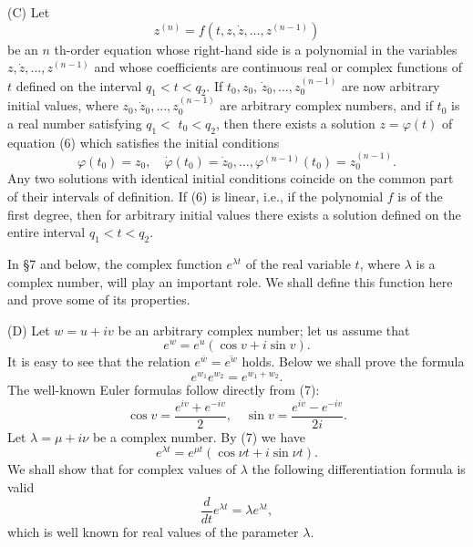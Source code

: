 \documentclass[10pt,a5paper]{book}
\theoremstyle{plain}
\theoremstyle{definition}
\theoremstyle{remark}
\begin{document}
(C) Let
\begin{equation*}
z^{(n)}=f\left(t, z, \dot{z}, \ldots, z^{(n-1)}\right) \tag{6}
\end{equation*}
be an $n$ th-order equation whose right-hand side is a polynomial in the variables $z, \dot{z}, \ldots, z^{(n-1)}$ and whose coefficients are continuous real or complex functions of $t$ defined on the interval $q_{1}<t<q_{2}$. If $t_{0}, z_{0}$, $\dot{z}_{0}, \ldots, z_{0}^{(n-1)}$ are now arbitrary initial values, where $z_{0}, \dot{z}_{0}, \ldots, z_{0}^{(n-1)}$ are arbitrary complex numbers, and if $t_{0}$ is a real number satisfying $q_{1}<$ $t_{0}<q_{2}$, then there exists a solution $z=\varphi(t)$ of equation (6) which satisfies the initial conditions
\[
\varphi\left(t_{0}\right)=z_{0}, \quad \dot{\varphi}\left(t_{0}\right)=\dot{z}_{0}, \ldots, \varphi^{(n-1)}\left(t_{0}\right)=z_{0}^{(n-1)} .
\]
Any two solutions with identical initial conditions coincide on the common part of their intervals of definition. If (6) is linear, i.e., if the polynomial $f$ is of the first degree, then for arbitrary initial values there exists a solution defined on the entire interval $q_{1}<t<q_{2}$.

In §7 and below, the complex function $e^{\lambda t}$ of the real variable $t$, where $\lambda$ is a complex number, will play an important role. We shall define this function here and prove some of its properties.

(D) Let $w=u+i v$ be an arbitrary complex number; let us assume that
\begin{equation*}
e^{w}=e^{u}(\cos v+i \sin v) . \tag{7}
\end{equation*}
It is easy to see that the relation $e^{\bar{w}}=\overline{e^{w}}$ holds. Below we shall prove the formula
\begin{equation*}
e^{w_{1}} e^{w_{2}}=e^{w_{1}+w_{2}} . \tag{8}
\end{equation*}
The well-known Euler formulas follow directly from (7):
\[
\cos v=\frac{e^{i v}+e^{-i v}}{2}, \quad \sin v=\frac{e^{i v}-e^{-i v}}{2 i} .
\]
Let $\lambda=\mu+i \nu$ be a complex number. By (7) we have
\[
e^{\lambda t}=e^{\mu t}(\cos \nu t+i \sin \nu t) .
\]
We shall show that for complex values of $\lambda$ the following differentiation formula is valid
\begin{equation*}
\frac{d}{d t} e^{\lambda t}=\lambda e^{\lambda t}, \tag{9}
\end{equation*}
which is well known for real values of the parameter $\lambda$.
\end{document}

